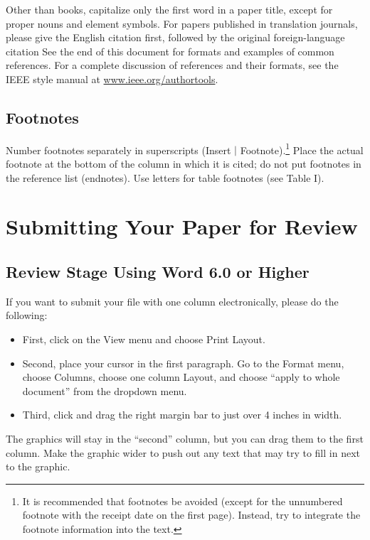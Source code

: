 \documentclass[journal]{IEEEtai}
\begin{document}
Other than books, capitalize only the first word in a paper title, except for proper nouns and element symbols. For papers published in translation journals, please give the English citation first, followed by the original foreign-language citation See the end of this document for formats and examples of common references. For a complete discussion of references and their formats, see the IEEE style manual at \underline{www.ieee.org/authortools}.

\subsection{Footnotes}

Number footnotes separately in superscripts (Insert $|$ Footnote).\footnote{It is recommended that footnotes be avoided (except for the unnumbered footnote with the receipt date on the first page). Instead, try to integrate the footnote information into the text.}  Place the actual footnote at the bottom of the column in which it is cited; do not put footnotes in the reference list (endnotes). Use letters for table footnotes (see Table I). 

\section{Submitting Your Paper for Review}

\subsection{Review Stage Using Word 6.0 or Higher}

If you want to submit your file with one column electronically, please do the following:

\begin{itemize}
\item[--\kern-4pt]First, click on the View menu and choose Print Layout.

\item[--\kern-4pt]Second, place your cursor in the first paragraph. Go to the Format menu, choose Columns, choose one column Layout, and choose ``apply to whole document” from the dropdown menu.

\item[--\kern-4pt]Third, click and drag the right margin bar to just over 4 inches in width.
\end{itemize}

The graphics will stay in the ``second'' column, but you can drag them to the first column. Make the graphic wider to push out any text that may try to fill in next to the graphic.
\end{document}
